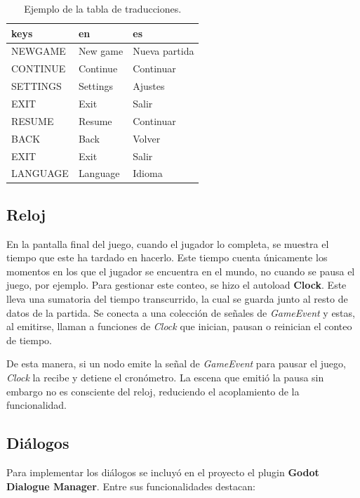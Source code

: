 \begin{table}[!ht]
    \centering
    \begin{tabular}{|l|l|l|}
    \hline
        keys & en & es \\ \hline
        NEWGAME & New game & Nueva partida \\ \hline
        CONTINUE & Continue & Continuar \\ \hline
        SETTINGS & Settings & Ajustes \\ \hline
        EXIT & Exit & Salir \\ \hline
        RESUME & Resume & Continuar \\ \hline
        BACK & Back & Volver \\ \hline
        EXIT & Exit & Salir \\ \hline
        LANGUAGE & Language & Idioma \\ \hline
    \end{tabular}
    \caption{Ejemplo de la tabla de traducciones.}
    \label{tab:localization-table}
\end{table}

\subsection{Reloj}

En la pantalla final del juego, cuando el jugador lo completa, se muestra el tiempo que este ha tardado en hacerlo. Este tiempo cuenta únicamente los momentos en los que el jugador se encuentra en el mundo, no cuando se pausa el juego, por ejemplo. Para gestionar este conteo, se hizo el autoload \textbf{Clock}. Este lleva una sumatoria del tiempo transcurrido, la cual se guarda junto al resto de datos de la partida. Se conecta a una colección de señales de \textit{GameEvent} y estas, al emitirse, llaman a funciones de \textit{Clock} que inician, pausan o reinician el conteo de tiempo.

De esta manera, si un nodo emite la señal de \textit{GameEvent} para pausar el juego, \textit{Clock} la recibe y detiene el cronómetro. La escena que emitió la pausa sin embargo no es consciente del reloj, reduciendo el acoplamiento de la funcionalidad.

\subsection{Diálogos}

Para implementar los diálogos se incluyó en el proyecto el plugin \textbf{Godot Dialogue Manager}. Entre sus funcionalidades destacan:


